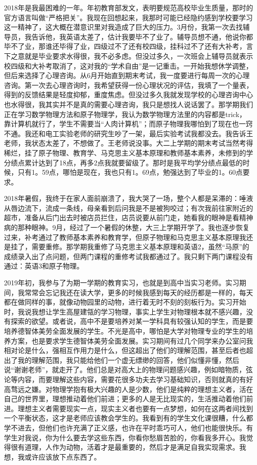 	    2018年是我最困难的一年。年初教育部发文，表明要规范高校毕业生质量，那时的官方语言叫做“严格把关”。我现在回想起来，我那时可能已经隐约感到学校要学习这一精神了，这大概在潜意识里对我造成了巨大的压力。3月份，我第一次去找辅导员，我告诉他，我英语太差了，估计我要毕不了业了。辅导员想不通，他说你都毕不了业，那谁还毕得了业，四级过不了还有校四级，挂科过不了还有大补考，言下之意就是毕业要求水得很，我不必多虑。但没过多久，一次班会上辅导员就表示校四级和大补考取消了，这对我的“学术自由”是一记重击。一开始我想休学调整，但后来选择了心理咨询。从6月开始直到期末考试，我一度要进行每周一次的心理咨询。第一次去心理咨询时，我希望获得一份心理状况的评估，我填了一个量表，得到的反馈结果是轻度抑郁，重度焦虑。但没过多久我就发现学校的心理咨询中心也水得很，我其实并不是真的需要心理咨询，我只是想找人说话罢了。那学期我们正在学习数学物理方法和原子物理学，我认为数学物理方法里的内容都是trick，靠计算机就行了，学生不需要当“人肉计算机”；而原子物理我哪怕到了现在也一窍不通。我还和电工实验老师的研究生吵了一架，最后实验考试我都没去。我告诉王老师，我状态太差了，不想做了。王老师说没事。大二上学期的期末考试当然考得稀烂，挂了原子物理、教育学、马克思主义基本原理和教师基本素养，未修到的学分绩点累计达到了18点，再多2点我就要留级了。那时是我平均学分绩点最低的时候，只有1。59点，哪怕是现在，我也只有1。69点，勉强达到了毕业的1。60点要求。

	    2018年暑假，我终于在家人面前崩溃了，我大哭了一场，整个人都是呆滞的：唾液从唇边流下，流成一条线，母亲看到后问我是不是被狗咬过；有次我前往家附近的超市，准备从后门出去时被店员拦住，店员说要从前门走，她看我的眼神是看精神病的那种眼神。9月，经过了一个暑假的休整，大三上学期开学了。我也逐步恢复过来，补考通过了教师基本素养和教育学，但原子物理和马克思主义基本原理我还是挂了，需要重修。那学期我重修了马克思主义基本原理和英语2，虽然“马原”的成绩录入出了点问题，但两门课程的重修考试我都通过了。我只剩下两门课程没有通过：英语3和原子物理。

	    2019年初，我参与了为期一学期的教育实习，也就是到高中当实习老师。实习期间，我常常会忘记我还在读大学，更多的时候我感到每天的经历都是一样的，每天都在做同样的事，就像动物园里的动物，进行着无时不刻的刻板行为。实习开始时，我说我想让学生高屋建瓴的学习物理，事实上学生对物理根本就不感兴趣，没有探索的欲望。或者说，高中不是要培养对某一学科具有较强认知的学生，而是要培养德智体美劳全面发展的学生。不光是高中，哪怕是大学对物理专业的学生的培养方案，也是要求学生德智体美劳全面发展。实习期间有过几个同学来办公室问我相对论是什么，强相互作用力是什么，但这超出了他们的理解范围，甚至后者也超出了我的理解范围，我只能给他们一个虚无缥缈的回答，他们似懂非懂，然后说“谢谢老师”，就走开了。他们总是对高大上的物理问题感兴趣，例如暗物质，弦论等内容，而要理解这些内容，需要花很多功夫去学习基础知识，否则就真的有好高骛远之嫌。对物理学抱有极大兴趣的人是少数，他们是纯粹的理想主义者，活在自己的世界里，理想推动着他们前进；更多的人是无比现实的，生活推动着他们前进。理想主义者需要现实一点，现实主义者也要有一点梦想，如何在这两者间找到一个平衡状态，这才是老师应该教会学生的。我看到有的学生文化课很糟，什么都学不进去，但他们也许充满了正义感，也许在平时乖巧可人，他们也能很快乐。有学生对我说，你为什么要去学这些东西，你看你愁眉苦脸的，你看我多开心。我觉得很有道理，人作为动物，活着才是最重要的，然后才是满足自我实现需求。我想，我或许应该放下点东西了。

